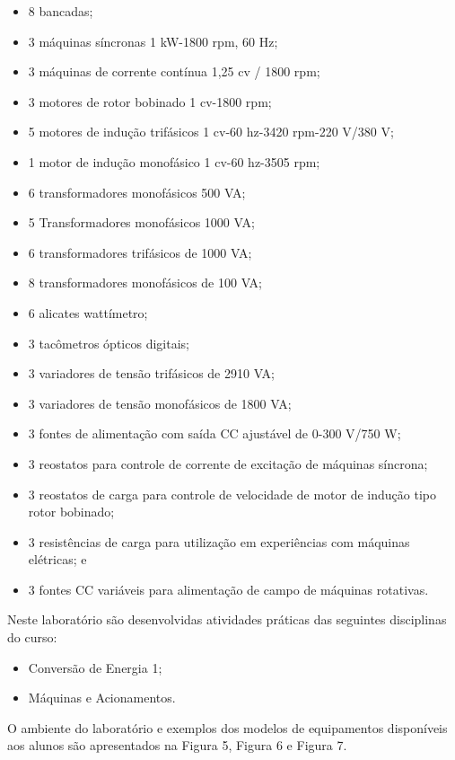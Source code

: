 \begin{itemize}
    \item 8 bancadas; 
    \item 3 máquinas síncronas 1 kW-1800 rpm, 60 Hz; 
    \item 3 máquinas de corrente contínua 1,25 cv / 1800 rpm; 
    \item 3 motores de rotor bobinado 1 cv-1800 rpm; 
    \item 5 motores de indução trifásicos 1 cv-60 hz-3420 rpm-220 V/380 V; 
    \item 1 motor de indução monofásico 1 cv-60 hz-3505 rpm; 
    \item 6 transformadores monofásicos 500 VA; 
    \item 5 Transformadores monofásicos 1000 VA; 
    \item 6 transformadores trifásicos de 1000 VA; 
    \item 8 transformadores monofásicos de 100 VA; 
    \item 6 alicates wattímetro; 
    \item 3 tacômetros ópticos digitais; 
    \item 3 variadores de tensão trifásicos de 2910 VA; 
    \item 3 variadores de tensão monofásicos de 1800 VA; 
    \item 3 fontes de alimentação com saída CC ajustável de 0-300 V/750 W; 
    \item 3 reostatos para controle de corrente de excitação de máquinas síncrona; 
    \item 3 reostatos de carga para controle de velocidade de motor de indução tipo rotor bobinado; 
    \item 3 resistências de carga para utilização em experiências com máquinas elétricas; e
    \item 3 fontes CC variáveis para alimentação de campo de máquinas rotativas.    
\end{itemize}

Neste laboratório são desenvolvidas atividades práticas das seguintes disciplinas do curso:

\begin{itemize}
    \item Conversão de Energia 1;
    \item Máquinas e Acionamentos.    
\end{itemize}

O ambiente do laboratório e exemplos dos modelos de equipamentos disponíveis aos alunos são apresentados na Figura 5, Figura 6 e Figura 7.


